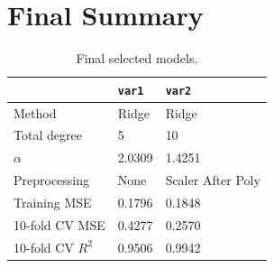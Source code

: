 \documentclass[12pt,a4paper]{article}
\begin{document}
\section{Final Summary}

\begin{table}[H]
\centering
\begin{tabular}{lll}
\toprule
 & \texttt{var1} & \texttt{var2} \\
\midrule
Method & Ridge & Ridge \\
Total degree & 5 & 10 \\
$\alpha$ & 2.0309 & 1.4251 \\
Preprocessing & None & Scaler After Poly \\
\midrule
Training MSE & 0.1796 & 0.1848 \\
10-fold CV MSE & 0.4277 & 0.2570 \\
10-fold CV $R^2$ & 0.9506 & 0.9942 \\
\bottomrule
\end{tabular}
\caption{Final selected models.}
\end{table}
\end{document}
